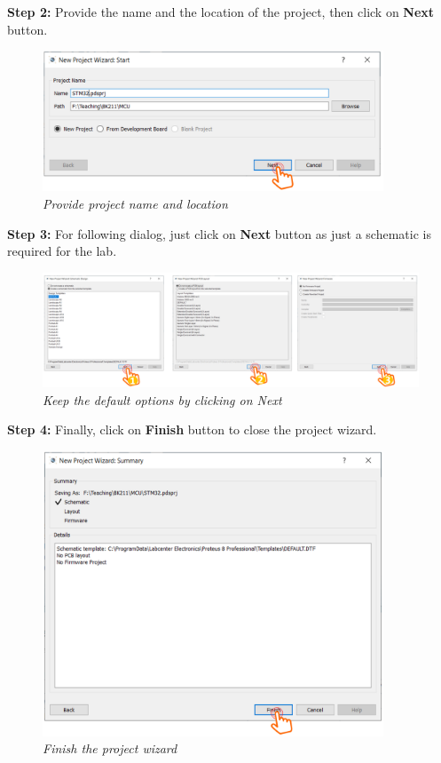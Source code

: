 \textbf{Step 2: } Provide the name and the location of the project, then click on \textbf{Next} button.\\

\begin{figure}[!htp]
    \centering
    \includegraphics[width=4in]{source/picture/bai_1/pic6.PNG}
    \caption{\textit{Provide project name and location}}
    \label{bai1_pic6}
\end{figure}

\textbf{Step 3: } For following dialog, just click on \textbf{Next} button as just a schematic is required for the lab.

\begin{figure}[!htp]
    \centering
    \includegraphics[width=5.5in]{source/picture/bai_1/pic7.PNG}
    \caption{\textit{Keep the default options by clicking on Next}}
    \label{bai1_pic7}
\end{figure}
\newpage
\textbf{Step 4: } Finally, click on \textbf{Finish} button to close the project wizard. \\

\begin{figure}[!htp]
    \centering
    \includegraphics[width=4in]{source/picture/bai_1/pic8.PNG}
    \caption{\textit{Finish the project wizard}}
    \label{bai1_pic8}
\end{figure}


